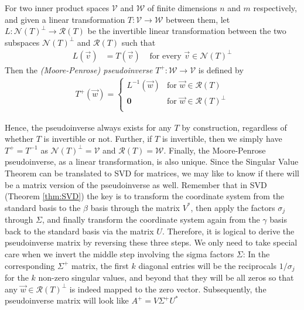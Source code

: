 \begin{defn}
\label{defn:pseudoinversetrans}
For two inner product spaces $\mathcal{V}$ and $\mathcal{W}$ of finite dimensions $n$ and $m$ respectively, and given a linear transformation $T\colon \mathcal{V} \to \mathcal{W}$ between them, let $L\colon \mathcal{N}(T)^\perp \to \mathcal{R}(T)$ be the invertible linear transformation between the two subspaces $\mathcal{N}(T)^\perp$ and $\mathcal{R}(T)$ such that 
\begin{align}
L(\vec{v}) &= T(\vec{v}) & \text{ for every } \vec{v} \in \mathcal{N}(T)^\perp   
\end{align}
Then the \textit{(Moore-Penrose) pseudoinverse} $T^+: \mathcal{W} \to \mathcal{V}$ is defined by
\begin{align}
T^+(\vec{w}) = \begin{cases}
L^{-1}(\vec{w}) & \text{for $\vec{w} \in \mathcal{R}(T)$} \\
\textbf{0} & \text{for $\vec{w} \in \mathcal{R}(T)^\perp$} \\
\end{cases}
\end{align}
\end{defn}
Hence, the pseudoinverse always exists for any $T$ by construction, regardless of whether $T$ is invertible or not. Further, if $T$ is invertible, then we simply have $T^+ = T^{-1}$ as $\mathcal{N}(T)^\perp = \mathcal{V}$ and $\mathcal{R}(T) = \mathcal{W}$. Finally, the Moore-Penrose pseudoinverse, as a linear transformation, is also unique. Since the Singular Value Theorem can be translated to SVD for matrices, we may like to know if there will be a matrix version of the pseudoinverse as well. Remember that in SVD (Theorem \ref{thm:SVD}) the key is to transform the coordinate system from the standard basis to the $\beta$ basis through the matrix $V^*$, then apply the factors $\sigma_j$ through $\Sigma$, and finally transform the coordinate system again from the $\gamma$ basis back to the standard basis via the matrix $U$. Therefore, it is logical to derive the pseudoinverse matrix by reversing these three steps. We only need to take special care when we invert the middle step involving the sigma factors $\Sigma$: In the corresponding $\Sigma^+$ matrix, the first $k$ diagonal entries will be the reciprocals $1/\sigma_j$ for the $k$ non-zero singular values, and beyond that they will be all zeros so that any $\vec{w} \in \mathcal{R}(T)^\perp$ is indeed mapped to the zero vector. Subsequently, the pseudoinverse matrix will look like $A^+ = V\Sigma^+ U^*$
